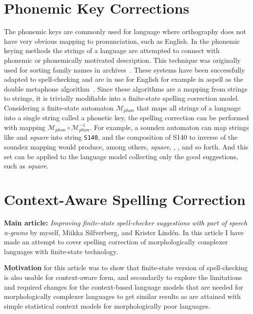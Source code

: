 \documentclass[officiallayout,draft]{unihelcompling}
\newcommand\misspelt{\bgroup\markoverwith
{\textcolor{red}{\lower3.5pt\hbox{\sixly \char58}}}\ULon}
\begin{document}
\section{Phonemic Key Corrections}
\label{sec:phonemic}

The phonemic keys are commonly used for language where orthography does not
have very obvious mapping to pronunciation, such as English. In the phonemic
keying methods the strings of a language are attempted to connect with phonemic
or phonemically motivated description. This technique was originally used for
sorting family names in archives~\citep{russell1918soundex}. These systems have
been successfully adapted to spell-checking and are in use for English for
example in aspell as the double metaphone algorithm~\citep{philips2000double}.
Since these algorithms are a mapping from strings to strings, it is trivially
modifiable into a finite-state spelling correction model. Considering a
finite-state automaton $\mathcal{M}_{phon}$ that maps all strings of a language
into a single string called a phonetic key, the spelling correction can be
performed with mapping $\mathcal{M}_{phon} \circ \mathcal{M}_{phon}^{-1}$.
For example, a soundex automaton can map strings like \misspelt{squer} and
\emph{square} into string \texttt{S140}, and the composition of S140 to 
inverse of the soundex mapping would produce, among others, \emph{square},
\misspelt{squer}, \misspelt{sqr}, \misspelt{sqrrr} and so forth. And this set
can be applied to the language model collecting only the good suggestions, such
as \emph{square}.

\section{Context-Aware Spelling Correction}
\label{sec:context}

\textbf{Main article:} \emph{Improving finite-state spell-checker suggestions
with part of speech n-grams} by myself, Miikka Silfverberg, and Krister
Lindén. In this article I have made an attempt to cover spelling correction
of morphologically complexer languages with finite-state technology.

\textbf{Motivation} for this article was to show that finite-state version of
spell-checking is also usable for context-aware form, and secondarily to
explore the limitations and required changes for the context-based language
models that are needed for morphologically complexer languages to get similar
results as are attained with simple statistical context models for
morphologically poor languages.
\end{document}
